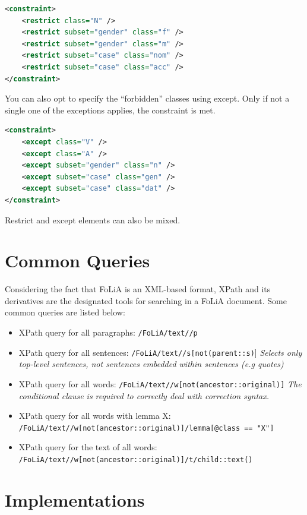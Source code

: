 \documentclass[a4paper,12pt]{report}
\begin{document}
\begin{lstlisting}[language=xml]
<constraint>
    <restrict class="N" />
    <restrict subset="gender" class="f" />
    <restrict subset="gender" class="m" />
    <restrict subset="case" class="nom" />
    <restrict subset="case" class="acc" />
</constraint>
\end{lstlisting}

You can also opt to specify the ``forbidden'' classes using except. Only if not a single one of the exceptions applies, the constraint is met. 

\begin{lstlisting}[language=xml]
<constraint>
    <except class="V" />
    <except class="A" />
    <except subset="gender" class="n" />
    <except subset="case" class="gen" />
    <except subset="case" class="dat" />
</constraint>
\end{lstlisting}

Restrict and except elements can also be mixed.


\appendix
\chapter{Common Queries}

Considering the fact that FoLiA is an XML-based format, XPath and its derivatives are the designated tools for searching in a FoLiA document. Some common queries are listed below:

\begin{itemize}
\item XPath query for all paragraphs: \texttt{/FoLiA/text//p}
\item XPath query for all sentences: \texttt{/FoLiA/text//s[not(parent::s)}] \emph{Selects only top-level sentences, not sentences embedded within sentences (e.g quotes)}
\item XPath query for all words: \texttt{/FoLiA/text//w[not(ancestor::original)]} \emph{The conditional clause is required to correctly deal with correction syntax.}
\item XPath query for all words with lemma X: \\ \texttt{/FoLiA/text//w[not(ancestor::original)]/lemma[@class == "X"]}
\item XPath query for the text of all words: \\ \texttt{/FoLiA/text//w[not(ancestor::original)]/t/child::text()}
\end{itemize}

\chapter{Implementations}
\end{document}
